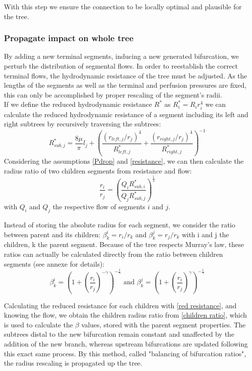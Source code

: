 \documentclass[a4paper, 11pt]{article} %
\begin{document}
With this step we ensure the connection to be locally optimal and plausible for the tree.

\subsubsection{Propagate impact on whole tree}
By adding a new terminal segments, inducing a new generated bifurcation, we perturb the distribution of segmental flows. In order to reestablish the correct terminal flows, the hydrodynamic resistance of the tree must be adjusted. As the lengths of the segments as well as the terminal and perfusion pressures are fixed, this can only be accomplished by proper rescaling of the segment's radii.\\

If we define the reduced hydrodynamic resistance $R^*$ as $R^*_i = R_i r_i^4$ we can calculate the reduced hydrodynamic resistance of a segment including its left and right subtrees by recursively traversing the subtrees:
\begin{equation} \label{red resistance}
R^*_{sub,j} = \frac{8\mu}{\pi}l_j + \left( \frac{(r_{left,j}/r_j)^4}{R_{left,j}^*} + \frac{(r_{right,j}/r_j)^4}{R_{right,j}^*}\right)^{-1}
\end{equation}
Considering the assumptions \ref{Pdrop} and \ref{resistance}, we can then calculate the radius ratio of two children segments from resistance and flow:
\begin{equation} \label{children ratio}
\frac{r_i}{r_j} = \left(\frac{Q_iR_{sub,i}^*}{Q_jR_{sub,j}^*}\right)^\frac{1}{4}
\end{equation}
with $Q_i$ and $Q_j$ the respective flow of segments $i$ and $j$.

Instead of storing the absolute radius for each segment, we consider the ratio between parent and its children: $\beta^i_k = r_i / r_k$ and $\beta^j_k = r_j / r_k$ with i and j the children, k the parent segment. Because of the tree respects Murray's law, these ratios can actually be calculated directly from the ratio between children segments (see annexe for details):
\begin{equation}
\beta^i_k = \left( 1 + (\frac{r_i}{r_j})^{-\gamma}\right)^{-\frac{1}{\gamma}} \text{ and }
\beta^j_k = \left( 1 + (\frac{r_i}{r_j})^{\gamma}\right)^{-\frac{1}{\gamma}}
\end{equation}


Calculating the reduced resistance for each children with \eqref{red resistance}, and knowing the flow, we obtain the children radius ratio from \eqref{children ratio}, which is used to calculate the $\beta$ values, stored with the parent segment properties. 
The subtrees distal to the new bifurcation remain constant and unaffected by the addition of the new branch, whereas upstream bifurcations are updated following this exact same process. By this method, called "balancing of bifurcation ratios", the radius rescaling is propagated up the tree.
 
\end{document}
